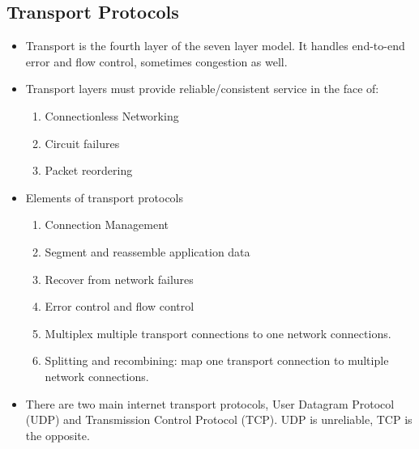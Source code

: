 \documentclass{scrartcl}
\begin{document}
\subsection*{Transport Protocols}
\begin{itemize}
\item Transport is the fourth layer of the seven layer model. It handles
end-to-end error and flow control, sometimes congestion as well.
\item Transport layers must provide reliable/consistent service in the face of:
\begin{enumerate}
\item Connectionless Networking
\item Circuit failures
\item Packet reordering
\end{enumerate}
\item Elements of transport protocols
\begin{enumerate}
\item Connection Management
\item Segment and reassemble application data
\item Recover from network failures
\item Error control and flow control
\item Multiplex multiple transport connections to one network connections.
\item Splitting and recombining: map one transport connection to multiple
network connections.
\end{enumerate}
\item There are two main internet transport protocols, User Datagram Protocol
(UDP) and Transmission Control Protocol (TCP). UDP is unreliable, TCP is the
opposite.
\end{itemize}
\end{document}

